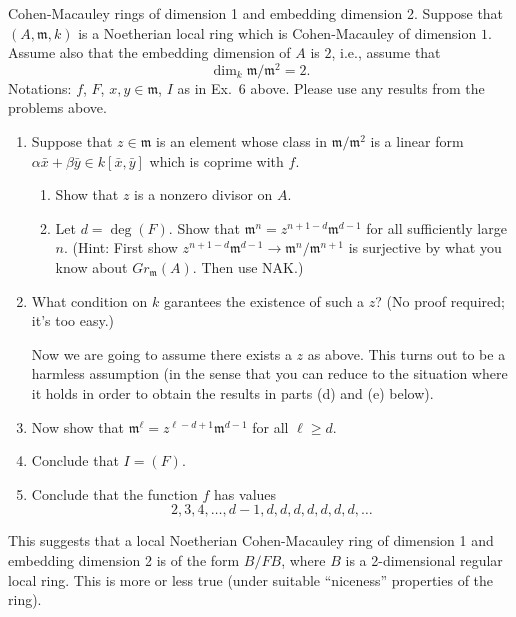 \begin{exercise}
\label{exercise-CM-dim-1-embedding-dim-2}
Cohen-Macauley rings of dimension 1 and embedding dimension 2.
Suppose that $(A, {\mathfrak m}, k)$ is a Noetherian local ring which is
Cohen-Macauley
of dimension $1$. Assume also that the embedding dimension of $A$ is
$2$, i.e., assume that
$$
\dim_k {\mathfrak m}/{\mathfrak m}^2 = 2.	
$$
Notations: $f$, $F$, $x, y\in {\mathfrak m}$, $I$ as in Ex.\ 6 above. Please
use any results from the problems above.
\begin{enumerate}
\item Suppose that $z\in {\mathfrak m}$ is an element whose class
in ${\mathfrak m}/{\mathfrak m}^2$ is a linear form
$\alpha \bar x + \beta \bar y \in k[\bar x, \bar y]$
which is coprime with $f$.
\begin{enumerate}
\item Show that $z$ is a nonzero divisor on $A$.
\item Let $d = \deg(F)$.
Show that ${\mathfrak m}^n = z^{n + 1-d}{\mathfrak m}^{d-1}$
for all sufficiently large $n$. (Hint: First show
$z^{n + 1-d}{\mathfrak m}^{d-1} \to {\mathfrak m}^n/{\mathfrak m}^{n + 1}$
is surjective by what you know about $Gr_{\mathfrak m}(A)$. Then use NAK.)
\end{enumerate}
\item What condition on $k$ garantees the existence of
such a $z$? (No proof required; it's too easy.)

\noindent
Now we are going to assume there exists a $z$ as above. This turns out
to be a harmless assumption (in the sense that you can reduce to
the situation where it holds in order to obtain the results in
parts (d) and (e) below).
\item Now show that ${\mathfrak m}^\ell = z^{\ell-d + 1} {\mathfrak m}^{d-1}$
for all $\ell \geq d$.
\item Conclude that $I = (F)$.
\item Conclude that the function $f$ has values
$$
2, 3, 4, \ldots, d-1, d, d, d, d, d, d, d, \ldots
$$
\end{enumerate}
\end{exercise}

\begin{remark}
\label{remark-CM-dim-1-embedding-dim-2}
This suggests that a local Noetherian Cohen-Macauley ring of dimension 1
and embedding dimension 2 is of the form $B/FB$, where $B$ is a 2-dimensional
regular local ring. This is more or less true (under suitable ``niceness''
properties of the ring).
\end{remark}






